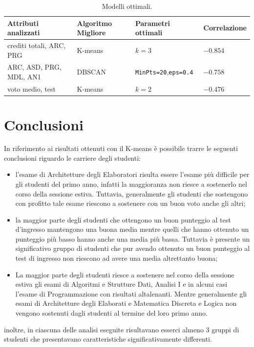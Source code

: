 \documentclass[12pt]{article}
\begin{document}
\begin{table}[H]
\begin{adjustbox}{max width=\textwidth}
\begin{tabular}{@{}llll@{}}
\toprule
Attributi analizzati     & Algoritmo Migliore & Parametri ottimali & Correlazione \\ \midrule
crediti totali, ARC, PRG & K-means            & $k=3$                & $-0.854$       \\
ARC, ASD, PRG, MDL, AN1  & DBSCAN             & \texttt{MinPts=20},\texttt{eps=0.4}  & $-0.758$ \\
voto medio, test         & K-means            & $k=2$                & $-0.476$       \\ \bottomrule
\end{tabular}
\end{adjustbox}
\caption{Modelli ottimali.}
\label{tab:mod-opt}
\end{table}

\newpage

\section{Conclusioni}
In riferimento ai risultati ottenuti con il K-means è possibile trarre le seguenti conclusioni riguardo
le carriere degli studenti:
\begin{itemize}
\item l'esame di Architetture degli Elaboratori risulta essere l'esame più difficile per gli studenti del primo anno,
  infatti la maggioranza non riesce a sostenerlo nel corso della sessione estiva. Tuttavia, generalmente gli studenti 
  che sostengono con profitto tale esame riescono a sostenere con un buon voto anche gli altri; 
\item la maggior parte degli studenti che ottengono un buon punteggio al test d'ingresso mantengono una buona media
  mentre quelli che hanno ottenuto un punteggio più basso hanno anche una media più bassa. Tuttavia è presente
  un significativo gruppo di studenti che pur avendo ottenuto un buon punteggio al test di ingresso non riescono
  ad avere una media altrettanto buona;
\item La maggior parte degli studenti riesce a sostenere nel corso della sessione estiva gli esami di Algoritmi e 
  Strutture Dati, Analisi I e in alcuni casi l'esame di Programmazione con risultati altalenanti. Mentre 
  generalmente gli esami di Architetture degli Elaborati e Matematica Discreta e Logica non vengono sostenuti
  dagli studenti al termine del loro primo anno.
\end{itemize}
inoltre, in ciascuna delle analisi eseguite risultavano esserci almeno 3 gruppi di studenti che presentavano 
caratteristiche significativamente differenti.
\end{document}
